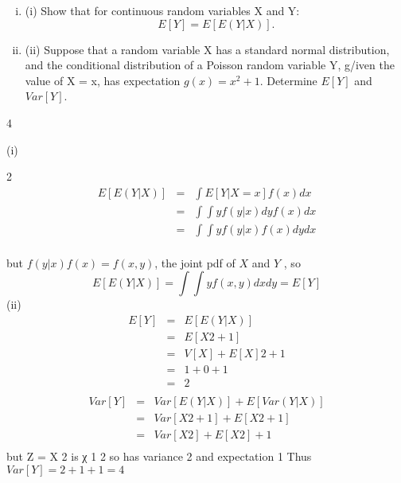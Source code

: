 \documentclass[a4paper,12pt]{article}
\begin{document}
\item 

\begin{enumerate}[(i)]
\item (i) Show that for continuous random variables X and Y:
\[E[Y] = E[E(Y|X)].\]
\item (ii)
Suppose that a random variable X has a standard normal distribution, and the
conditional distribution of a Poisson random variable Y, g/iven the value of
X = x, has expectation $g(x) = x^2 + 1$.
Determine $E[Y]$ and $Var[Y]$.
\end{enumerate}
4


(i)

2
\begin{eqnarray*}
E [ E ( Y | X )] &=& \int E [ Y | X = x ] f ( x ) dx\\
&=& \int \int yf ( y | x ) dy f ( x ) dx\\
&=& \int \int y f ( y | x ) f ( x ) dydx\\
\end{eqnarray*}

but $f ( y | x ) f ( x ) = f ( x , y )$, the joint pdf of $X$ and $Y$ , so
\[E [ E ( Y | X )] = \int \int y f ( x , y ) dxdy = E [ Y ]\]
(ii)
\begin{eqnarray*}
E [ Y ] &=& E [ E ( Y | X )] \\
&=& E [ X 2 + 1]\\
&=& V [ X ] + { E [ X ]} 2 + 1 \\
&=& 1 + 0 + 1 \\
&=& 2\\
\end{eqnarray*}
\begin{eqnarray*}
Var [ Y ] &=& Var [ E ( Y | X )] + E [ Var ( Y | X )] \\
&=& Var [ X 2 + 1] + E [ X 2 + 1]\\
&=& Var [ X 2 ] + E [ X 2 ] + 1\\
\end{eqnarray*}
but Z = X 2 is χ 1 2 so has variance 2 and expectation 1
Thus $Var [ Y ] = 2 + 1 + 1 = 4$
\end{document}
